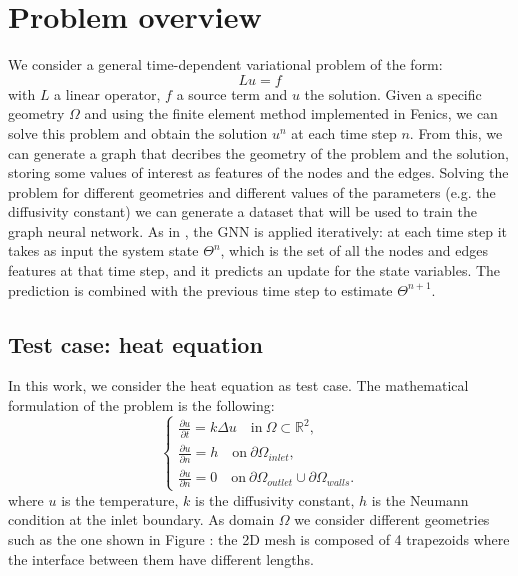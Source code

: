 \documentclass[11pt,a4paper]{article}
\begin{document}
\section{Problem overview}

We consider a general time-dependent variational problem of the form:
\[Lu=f\]
with \(L\) a linear operator, \(f\) a source term and \(u\) the solution. Given a specific 
geometry \(\Omega\) and using the finite element method implemented in Fenics, we can solve 
this problem and obtain the solution \(u^{n}\) at each time step \(n\). From this,
we can generate a graph that decribes the geometry of the problem and the solution, 
storing some values of interest as features of the nodes and the edges.
Solving the problem for different geometries and different values of the parameters
(e.g. the diffusivity constant) we can generate a dataset that will be used to train
the graph neural network. 
As in \cite{Luca}, the GNN is applied iteratively: at each time step it takes 
as input the system state \(\Theta^{n}\), which is the set of all the nodes and edges features 
at that time step, and it predicts an update for the state variables. The prediction is 
combined with the previous time step to estimate \(\Theta^{n+1}\).


\subsection{Test case: heat equation}
In this work, we consider the heat equation as test case. 
The mathematical formulation of the problem is the following:
\begin{equation}
    \begin{cases}
        \frac{\partial u }{\partial t} = k \Delta u \quad \text{in} \ \Omega \subset \mathbb{R}^2, \\
        \frac{\partial u}{\partial n} = h \quad \text{on} \ \partial \Omega_{inlet}, \\
        \frac{\partial u}{\partial n} = 0 \quad \text{on} \ \partial \Omega_{outlet} 
        \cup \partial \Omega_{walls}.
    \end{cases}
\end{equation}
where \(u\) is the temperature, \(k\) is the diffusivity constant, \(h\) is the
Neumann condition at the inlet boundary. As domain \(\Omega\) we consider different 
geometries such as the one shown in Figure : the 2D mesh is composed of 
4 trapezoids where the interface between them have different lengths.
\end{document}
